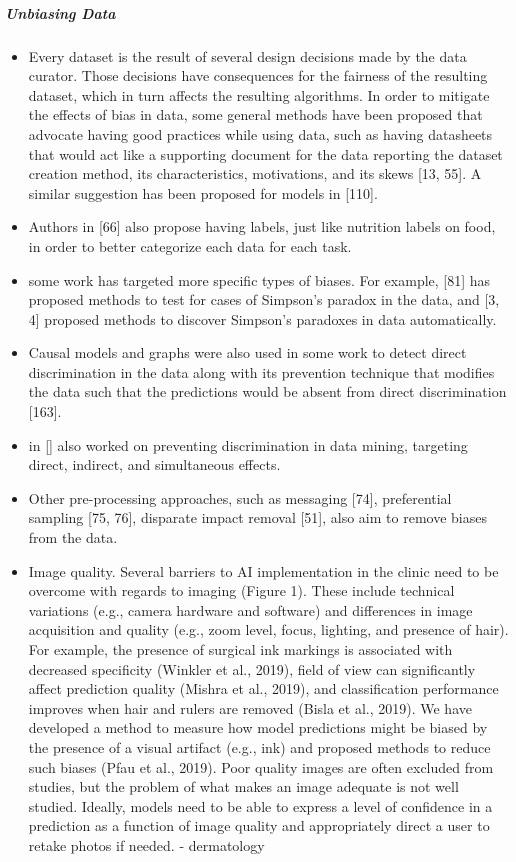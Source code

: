 \documentclass[12pt, a4paper, oneside]{book}   	%
\begin{document}
			\subparagraph{Unbiasing Data}
				\begin{itemize}
					\item Every dataset is the result of several design decisions made by the data curator. Those decisions have consequences for the fairness of the resulting dataset, which in turn affects the resulting algorithms. In order to mitigate the effects of bias in data, some general methods have been proposed that advocate having good practices while using data, such as having datasheets that would act like a supporting document for the data reporting the dataset creation method, its characteristics, motivations, and its skews [13, 55]. A similar suggestion has been proposed for models in [110].\autocite{Mehrabi_2021}
					\item Authors in [66] also propose having labels, just like nutrition labels on food, in order to better categorize each data for each task. \autocite{Mehrabi_2021}
					\item some work has targeted more specific types of biases. For example, [81] has proposed methods to test for cases of Simpson’s paradox in the data, and [3, 4] proposed methods to discover Simpson’s paradoxes in data automatically. \autocite{Mehrabi_2021}
					\item Causal models and graphs were also used in some work to detect direct discrimination in the data along with its prevention technique that modifies the data such that the predictions would be absent from direct discrimination [163].\autocite{Mehrabi_2021}
					\item in [\autocite{M62_Hajian_2013}] also worked on preventing discrimination in data mining, targeting direct, indirect, and simultaneous effects.\autocite{Mehrabi_2021}
					\item Other pre-processing approaches, such as messaging [74], preferential sampling [75, 76], disparate impact removal [51], also aim to remove biases from the data. \autocite{Mehrabi_2021}
					
					
					\item Image quality. Several barriers to \gls{AI} implementation in the clinic need to be overcome with regards to imaging (Figure 1). These include technical variations (e.g., camera hardware and software) and differences in image acquisition and quality (e.g., zoom level, focus, lighting, and presence of hair). For example, the presence of surgical ink markings is associated with decreased specificity (Winkler et al., 2019), field of view can significantly affect prediction quality (Mishra et al., 2019), and classification performance improves when hair and rulers are removed (Bisla et al., 2019). We have developed a method to measure how model predictions might be biased by the presence of a visual artifact (e.g., ink) and proposed methods to reduce such biases (Pfau et al., 2019). Poor quality images are often excluded from studies, but the problem of what makes an image adequate is not well studied. Ideally, models need to be able to express a level of confidence in a prediction as a function of image quality and appropriately direct a user to retake photos if needed. \autocite{Young_2020} - dermatology
				\end{itemize}
			
\end{document}
